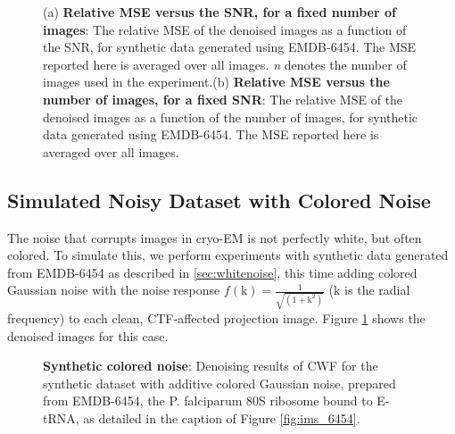 \documentclass[review]{elsarticle}
\begin{document}
\begin{figure}[]
\centering
{}
\caption{(a) \textbf{Relative MSE versus the SNR, for a fixed number of images}: 
The 
relative MSE of the denoised images as a function of the SNR, for synthetic 
data 
generated using EMDB-6454. The 
MSE reported here is averaged over all images. \textit{n} denotes the number of images 
used in the experiment.(b) \textbf{Relative MSE versus the number of images, for a fixed SNR}: 
The 
relative MSE of the denoised images as a function of the number of images, for 
synthetic data generated using EMDB-6454. The 
MSE reported here is averaged over all images. }
\end{figure}


\clearpage


\subsection{Simulated Noisy Dataset with Colored Noise}
\label{sec:colnoise}
The noise that corrupts images in cryo-EM is not perfectly white, but often 
colored. To simulate this, we perform experiments with synthetic data generated
from EMDB-6454 as described in \ref{sec:whitenoise}, this
time adding colored Gaussian noise with the noise
response $f(\text{k})=\frac{1}{\sqrt{(1+\text{k}^2)}}$ ($\text{k}$ is the radial 
frequency) to each 
clean,
CTF-affected projection image. Figure \ref{fig:ims_6454_colored}
shows the denoised images for this case.


\begin{figure}[]
\centering

\vspace{-1mm}
\vspace{-1mm}

\caption{\textbf{Synthetic colored noise}: Denoising results of 
CWF for the 
synthetic dataset with additive colored Gaussian noise, prepared from EMDB-6454, 
the P. falciparum 80S ribosome bound 
to E-tRNA, as detailed in the caption of Figure \ref{fig:ims_6454}.}
\label{fig:ims_6454_colored}
\end{figure}
\end{document}
